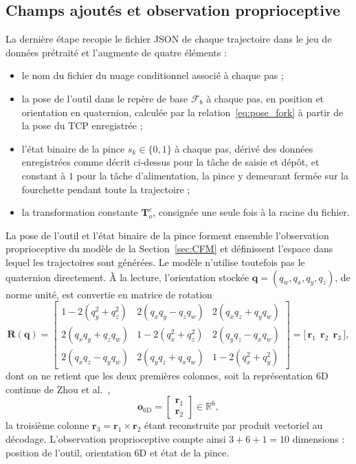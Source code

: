 \subsection*{Champs ajoutés et observation proprioceptive} La dernière étape recopie le fichier \ac{JSON} de chaque trajectoire dans le jeu de données prétraité et l'augmente de quatre éléments :
\begin{itemize}
  \item le nom du fichier du nuage conditionnel associé à chaque pas ;
  \item la pose de l'outil dans le repère de base $\mathcal{F}_b$ à chaque pas, en position et orientation en quaternion, calculée par la relation~\eqref{eq:pose_fork} à partir de la pose du \ac{TCP} enregistrée ;
  \item l'état binaire de la pince $s_k\in\{0,1\}$ à chaque pas, dérivé des données enregistrées comme décrit ci-dessus pour la tâche de saisie et dépôt, et constant à $1$ pour la tâche d'alimentation, la pince y demeurant fermée sur la fourchette pendant toute la trajectoire ;
  \item la transformation constante $\mathbf{T}_{o}^{e}$, consignée une seule fois à la racine du fichier.
\end{itemize}

La pose de l'outil et l'état binaire de la pince forment ensemble l'observation proprioceptive du modèle de la Section~\ref{sec:CFM} et définissent l'espace dans lequel les trajectoires sont générées. Le modèle n'utilise toutefois pas le quaternion directement. À la lecture, l'orientation stockée $\mathbf{q}=(q_w,q_x,q_y,q_z)$, de norme unité, est convertie en matrice de rotation
\begin{equation}\label{eq:quat_to_rot}
  \mathbf{R}(\mathbf{q}) =
  \begin{bmatrix}
    1-2(q_y^2+q_z^2) & 2(q_xq_y-q_zq_w) & 2(q_xq_z+q_yq_w) \\
    2(q_xq_y+q_zq_w) & 1-2(q_x^2+q_z^2) & 2(q_yq_z-q_xq_w) \\
    2(q_xq_z-q_yq_w) & 2(q_yq_z+q_xq_w) & 1-2(q_x^2+q_y^2)
  \end{bmatrix}
  = \bigl[\,\mathbf{r}_1\ \ \mathbf{r}_2\ \ \mathbf{r}_3\,\bigr],
\end{equation}
dont on ne retient que les deux premières colonnes, soit la représentation 6D continue de Zhou et al.~\cite{Zhou2020Continuity},
\begin{equation}\label{eq:zhou_6d}
  \mathbf{o}_{6\mathrm{D}} = \begin{bmatrix}\mathbf{r}_1\\[2pt] \mathbf{r}_2\end{bmatrix}\in\mathbb{R}^6,
\end{equation}
la troisième colonne $\mathbf{r}_3=\mathbf{r}_1\times\mathbf{r}_2$ étant reconstruite par produit vectoriel au décodage. L'observation proprioceptive compte ainsi $3+6+1=10$ dimensions : position de l'outil, orientation 6D et état de la pince.

